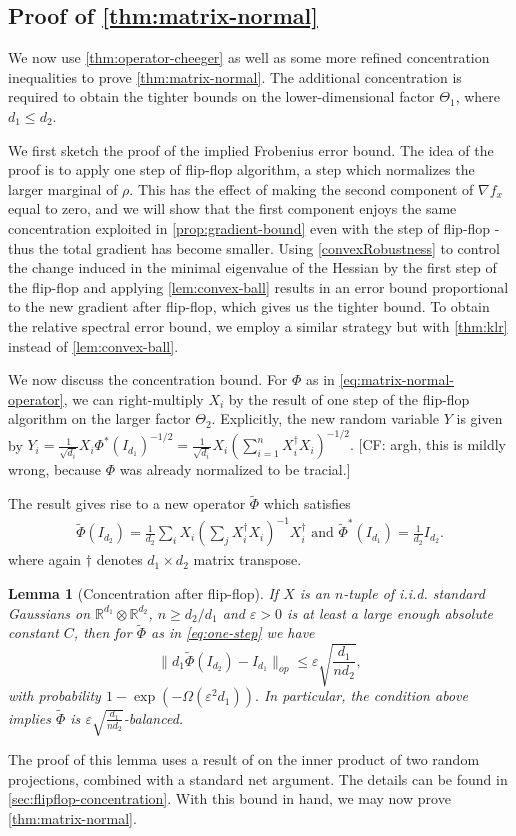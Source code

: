 \documentclass[aos]{imsart}
\newtheorem{lemma}[theorem]{Lemma}
\theoremstyle{definition}
\numberwithin{equation}{section}
\newcommand{\R}{{\mathbb{R}}}
\newcommand{\ot}{\otimes}
\newcommand{\eps}{\varepsilon}
\newcommand{\samp}{x}
\newcommand{\CF}[1]{{\color{purple}[CF: #1]}}
\begin{document}
\subsection{Proof of \cref{thm:matrix-normal}}
We now use \cref{thm:operator-cheeger} as well as some more refined concentration inequalities to prove \cref{thm:matrix-normal}. The additional concentration is required to obtain the tighter bounds on the lower-dimensional factor $\Theta_1$, where $d_1 \leq d_2$.

We first sketch the proof of the implied Frobenius error bound. The idea of the proof is to apply one step of flip-flop algorithm, a step which normalizes the larger marginal of $\rho$. This has the effect of making the second component of $\nabla f_\samp$ equal to zero, and we will show that the first component enjoys the same concentration exploited in \cref{prop:gradient-bound} even with the step of flip-flop - thus the total gradient has become smaller. Using \cref{convexRobustness} to control the change induced in the minimal eigenvalue of the Hessian by the first step of the flip-flop and applying \cref{lem:convex-ball} results in an error bound proportional to the new gradient after flip-flop, which gives us the tighter bound. To obtain the relative spectral error bound, we employ a similar strategy but with \cref{thm:klr} instead of \cref{lem:convex-ball}. 

We now discuss the concentration bound. For $\Phi$ as in \cref{eq:matrix-normal-operator}, we can right-multiply $X_i$ by the result of one step of the flip-flop algorithm on the larger factor $\Theta_2$. Explicitly, the new random variable $Y$ is given by
$Y_i = \frac{1}{\sqrt{d_i}} X_i \Phi^*(I_{d_1})^{-1/2} = \frac{1}{\sqrt{d_i}}  X_i (\sum_{i = 1}^n X_i^\dagger X_i)^{-1/2}.$ \CF{argh, this is mildly wrong, because $\Phi$ was already normalized to be tracial.}

The result gives rise to a new operator $\tilde{\Phi}$ which satisfies 
\begin{align} \tilde{\Phi}(I_{d_2}) = \frac{1}{d_2}\sum_{i} X_{i} \left( \sum_{j}  X_{i}^{\dagger} X_{i}\right)^{-1} X_{i}^\dagger \textrm{ and } \tilde{\Phi}^*(I_{d_1}) = \frac{1}{d_2} I_{d_2}.   \label{eq:one-step}\end{align}
where again $\dagger$ denotes $d_1\times d_2$ matrix transpose.
\begin{lemma}[Concentration after flip-flop]\label{lem:flipflop-concentration}
If $X$ is an $n$-tuple of i.i.d. standard Gaussians on $\R^{d_1}\ot \R^{d_2}$, $n \geq d_2/d_1$ and $\eps> 0$ is at least a large enough absolute constant $C$, then for $\tilde{\Phi}$ as in \cref{eq:one-step} we have
$$\|d_1 \tilde{\Phi}(I_{d_2}) - I_{d_1}\|_{op} \leq \eps \sqrt{ \frac{d_1}{nd_2}},$$
 with probability $1 - \exp(- \Omega( \eps^2 d_{1})).$ In particular, the condition above implies $\tilde{\Phi}$ is $\eps \sqrt{ \frac{d_1}{nd_2}}$-balanced.
\end{lemma}
The proof of this lemma uses a result of \cite{hayden2006aspects} on the inner product of two random projections, combined with a standard net argument. The details can be found in \cref{sec:flipflop-concentration}. With this bound in hand, we may now prove \cref{thm:matrix-normal}.
\end{document}
